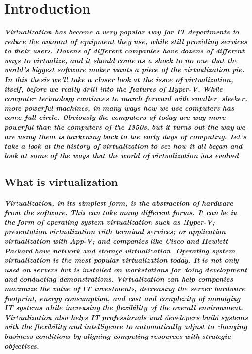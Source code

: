 \documentclass[a4paper,12pt]{report}
\begin{document}


\chapter{Introduction}

\paragraph{Virtualization has become a very popular way for IT departments to reduce the amount of equipment they use, while still providing services to their users. Dozens of different companies have dozens of different ways to virtualize, and it should come as a shock to no one that the world’s biggest software maker wants a piece of the virtualization pie.
In this thesis we’ll take a closer look at the issue of virtualization, itself, before we
really drill into the features of Hyper-V.
While computer technology continues to march forward with smaller, sleeker, more powerful machines, in many ways how we use computers has come full circle. Obviously the computers of today are way more powerful than the computers of the 1950s, but it turns out the way we are using them is harkening back to the early days of computing. Let’s take a look at the history of virtualization to see how it all began and look at some of the ways that the world of virtualization has evolved
}

\section{What is virtualization}

\paragraph{Virtualization, in its simplest form, is the abstraction of hardware from the software. This can take many different forms. It can be in the form of operating system virtualization such as Hyper-V; presentation virtualization with terminal services; or application virtualization with App-V; and companies like Cisco and Hewlett Packard have network and storage virtualization. Operating system virtualization is the most popular virtualization today. It is not only used on servers but is installed on workstations for doing development and conducting demonstrations. Virtualization can help companies maximize the value of IT investments, decreasing the server hardware footprint, energy consumption, and cost and complexity of managing IT systems while increasing the flexibility of the overall environment. Virtualization also helps IT professionals and developers build systems with the flexibility and intelligence to automatically adjust to changing business conditions by aligning computing resources with strategic objectives.
}
\end{document}
